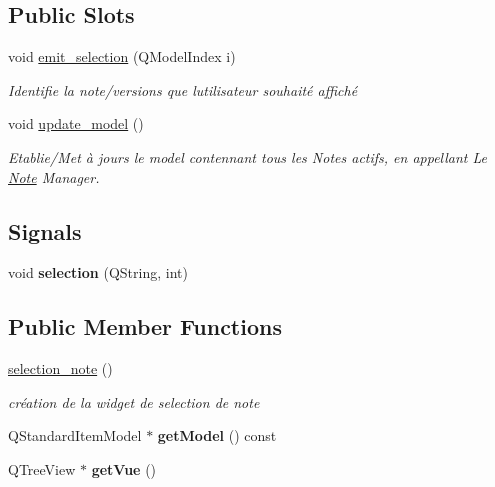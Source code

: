 \subsection*{Public Slots}
\begin{DoxyCompactItemize}
\item 
void \hyperlink{classselection__note_a70f407c89a87e5d8ce992f18ef64773d}{emit\+\_\+selection} (Q\+Model\+Index i)
\begin{DoxyCompactList}\small\item\em Identifie la note/versions que l\textquotesingle{}utilisateur souhaité affiché \end{DoxyCompactList}\item 
\mbox{\label{classselection__note_aab004424eba4264628d2e01108f2e63b}} 
void \hyperlink{classselection__note_aab004424eba4264628d2e01108f2e63b}{update\+\_\+model} ()
\begin{DoxyCompactList}\small\item\em Etablie/\+Met à jours le model contennant tous les Notes actifs, en appellant Le \hyperlink{class_note}{Note} Manager. \end{DoxyCompactList}\end{DoxyCompactItemize}
\subsection*{Signals}
\begin{DoxyCompactItemize}
\item 
\mbox{\label{classselection__note_ae1cc0e50817dcb45975fa33c9231ef0b}} 
void {\bfseries selection} (Q\+String, int)
\end{DoxyCompactItemize}
\subsection*{Public Member Functions}
\begin{DoxyCompactItemize}
\item 
\mbox{\label{classselection__note_a69a11fa0461c0c103f099e894bf0b399}} 
\hyperlink{classselection__note_a69a11fa0461c0c103f099e894bf0b399}{selection\+\_\+note} ()
\begin{DoxyCompactList}\small\item\em création de la widget de selection de note \end{DoxyCompactList}\item 
\mbox{\label{classselection__note_a87ea63b64611ba8668ab50affd116aea}} 
Q\+Standard\+Item\+Model $\ast$ {\bfseries get\+Model} () const
\item 
\mbox{\label{classselection__note_aa4468145cd30e1fab18f3f7c2b5437aa}} 
Q\+Tree\+View $\ast$ {\bfseries get\+Vue} ()
\end{DoxyCompactItemize}


